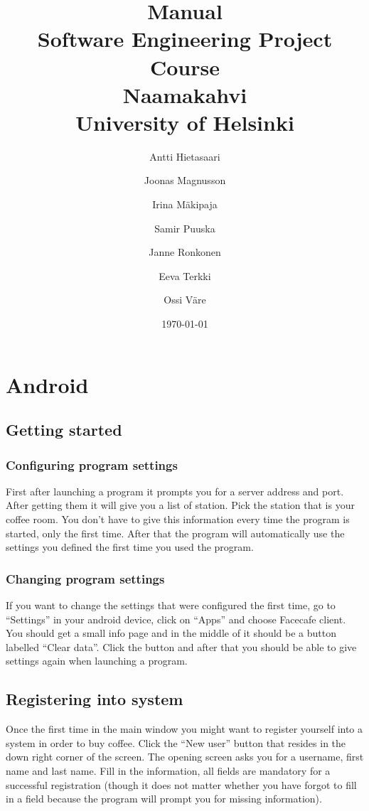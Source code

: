 \documentclass[11pt]{article}
\title{Manual\\
  Software Engineering Project Course\\
  Naamakahvi\\
  University of Helsinki}
\author{Antti Hietasaari
  \and Joonas Magnusson
  \and Irina Mäkipaja
  \and Samir Puuska
  \and Janne Ronkonen
  \and Eeva Terkki
  \and Ossi Väre}
\date{\today}
\begin{document}
\maketitle

\setcounter{tocdepth}{2}
\tableofcontents



\section{Android}
\subsection{Getting started}
\subsubsection*{Configuring program settings}
First after launching a program it prompts you for a server address and port. After getting them it will give you a list of station. Pick the station that is your coffee room. You don’t have to give this information every time the program is started, only the first time. After that the program will automatically use the settings you defined the first time you used the program.

\subsubsection*{Changing program settings}

If you want to change the settings that were configured the first time, go to “Settings” in your android device, click on “Apps” and choose Facecafe client. You should get a small info page and in the middle of it should be a button labelled “Clear data”. Click the button and after that you should be able to give settings again when launching a program.


\subsection{Registering into system}

Once the first time in the main window you might want to register yourself into a system in order to buy coffee. Click the “New user” button that resides in the down right corner of the screen. The opening screen asks you for a username, first name and last name. Fill in the information, all fields are mandatory for a successful registration (though it does not matter whether you have forgot to fill in a field because the program will prompt you for missing information).
\end{document}
